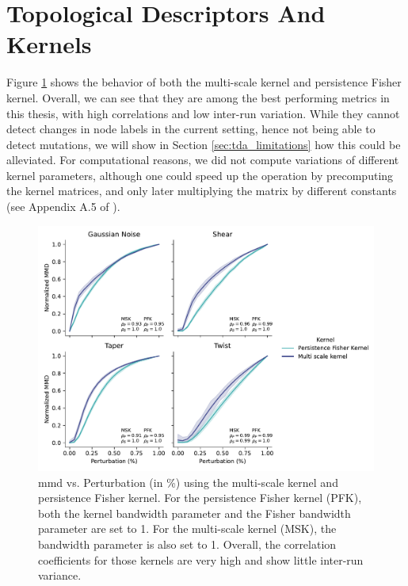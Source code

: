 \section{Topological Descriptors And Kernels}\label{sec:results_topo_kernels}

Figure \ref{fig:tda_kernels} shows the behavior of both the multi-scale kernel
and persistence Fisher kernel. Overall, we can see that they are among the best
performing metrics in this thesis, with high correlations and low inter-run
variation. While they cannot detect changes in node labels in the current
setting, hence not being able to detect mutations, we will show in Section
\ref{sec:tda_limitations} how this could be alleviated. For computational
reasons, we did not compute variations of different kernel parameters, although
one could speed up the operation by precomputing the kernel matrices, and only
later multiplying the matrix by different constants (see Appendix A.5 of
\cite{o2021evaluation}).

\begin{figure}
  \centering
  \includegraphics[width=\textwidth]{./figures/results/res_6.pdf}
  \caption[\acrshort{mmd} using topological kernels.]{\acrshort{mmd} vs. Perturbation (in \%) using the multi-scale
kernel and persistence Fisher kernel. For the persistence Fisher kernel (PFK), both
the kernel bandwidth parameter and the Fisher bandwidth parameter are set to 1.
For the multi-scale kernel (MSK), the bandwidth parameter is also set to 1. Overall,
the correlation coefficients for those kernels are very high and show little
inter-run variance.}
  \label{fig:tda_kernels}
\end{figure}


